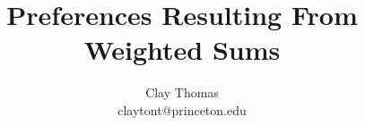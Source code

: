 \documentclass[12pt]{article}
\newcommand{\1}[1]{\mathds{1}[{#1}]}
\begin{document}
 
\title{Preferences Resulting From Weighted Sums}
\author{Clay Thomas\\
claytont@princeton.edu }

\maketitle

% 
% 
% 
\end{document}
